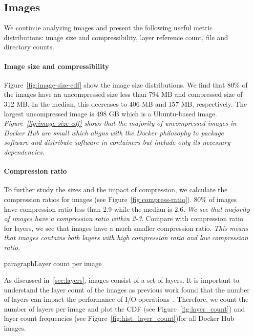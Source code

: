 \subsection{Images}
\label{sec:images}

We continue analyzing images and present the following useful metric
distributions: image size and compressibility, layer reference count, file and
directory counts.

\paragraph{Image size and compressibility}

Figure~\ref{fig:image-size-cdf} show the image size distributions.
%
%
We find that 80\% of the images have an uncompressed size less than 794 MB and
compressed size of 312 MB.
%
In the median, this decreases to 406 MB and 157 MB, respectively.
%
The largest uncompressed image is 498 GB which is a Ubuntu-based image.
%
\emph{Figure~\ref{fig:image-size-cdf} shows that the majority of uncompressed
images in Docker Hub are small which aligns with the Docker philosophy to
package software and distribute software in containers but include only its
necessary dependencies.}



\paragraph{Compression ratio}

To further study the sizes and the impact of compression, we calculate the
compression ratios for images (see Figure~\ref{fig:compress-ratio}).
%
80\% of images have compression ratio less than 2.9 while the median is 2.6.
%
\textit{We see that majority of images have a compression ratio within 2-3.}
Compare with compression ratio for layers, we see that images have a much
smaller compression ratio. 
%
\textit{This means that images contains both layers with high compression ratio
and low compression ratio.}

paragraph{Layer count per image}



As discussed in~\ref{sec:layers}, images consist of a set of layers.
%
It is important to understand the layer count of the images as previous work
found that the number of layers can impact the performance of I/O
operations~\cite{slacker}.
%
Therefore, we count the number of layers per image and plot the CDF (see
Figure~\ref{fig:layer_count}) and layer count frequencies (see
Figure~\ref{fig:hist_layer_count})for all Docker Hub images.

